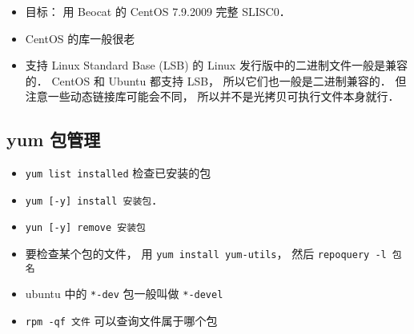 
\begin{issues}
\issueDraft
\end{issues}

\begin{itemize}
\item 目标： 用 Beocat 的 CentOS 7.9.2009 完整 SLISC0．
\item CentOS 的库一般很老
\item 支持 Linux Standard Base (LSB) 的 Linux 发行版中的二进制文件一般是兼容的． CentOS 和 Ubuntu 都支持 LSB， 所以它们也一般是二进制兼容的． 但注意一些动态链接库可能会不同， 所以并不是光拷贝可执行文件本身就行．
\end{itemize}

\subsection{yum 包管理}
\begin{itemize}
\item \verb|yum list installed| 检查已安装的包
\item \verb|yum [-y] install 安装包|．
\item \verb|yun [-y] remove 安装包|
\item 要检查某个包的文件， 用 \verb|yum install yum-utils|， 然后 \verb|repoquery -l 包名|
\item ubuntu 中的 \verb|*-dev| 包一般叫做 \verb|*-devel|
\item \verb|rpm -qf 文件| 可以查询文件属于哪个包
\end{itemize}
